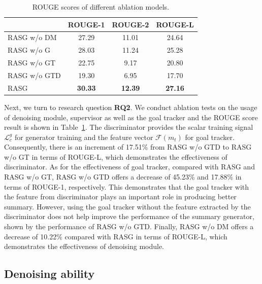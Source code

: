 \documentclass[letterpaper]{article} %
\begin{document}
\begin{table}[t]
\centering
\small
\caption{ROUGE scores of different ablation models.}
\begin{tabular}{@{}lcc c@{}}
\toprule
& ROUGE-1 & ROUGE-2 & ROUGE-L \\
\midrule
RASG w/o DM & 27.29 & 11.01 & 24.64 \\
RASG w/o G & 28.03 & 11.24 & 25.28 \\
RASG w/o GT & 22.75 & 9.17 & 20.80 \\
RASG w/o GTD & 19.30 & 6.95 & 17.70 \\
RASG & \textbf{30.33} & \textbf{12.39} & \textbf{27.16} \\
\bottomrule
\end{tabular}
\label{tab:comp_rouge_ablation}
\end{table}
Next, we turn to research question \textbf{RQ2}.
We conduct ablation tests on the usage of denoising module, supervisor as well as the goal tracker and the ROUGE score result is shown in Table~\ref{tab:comp_rouge_ablation}.
The discriminator provides the scalar training signal $\mathcal{L}_c^g$ for generator training and the feature vector $\mathcal{F}(m_t)$ for goal tracker.
Consequently, there is an increment of 17.51\% from RASG w/o GTD to RASG w/o GT in terms of ROUGE-L, which demonstrates the effectiveness of discriminator.
As for the effectiveness of goal tracker, compared with RASG and RASG w/o GT, RASG w/o GTD offers a decrease of 45.23\% and 17.88\% in terms of ROUGE-1, respectively. This demonstrates that the goal tracker with the feature from discriminator plays an important role in producing better summary.
However, using the goal tracker without the feature extracted by the discriminator does not help improve the performance of the summary generator, shown by the performance of RASG w/o GTD.
Finally, RASG w/o DM offers a decrease of 10.22\% compared with RASG in terms of ROUGE-L, which demonstrates the effectiveness of denoising module. 

\subsection{Denoising ability}
\end{document}
